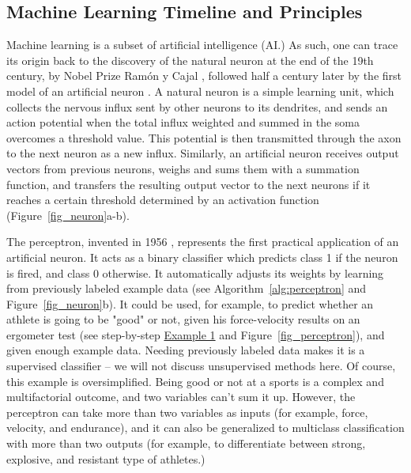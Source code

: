 \subsection{Machine Learning Timeline and Principles}

Machine learning is a subset of artificial intelligence (AI.) As such, one can trace its origin back to the discovery of the natural neuron at the end of the 19th century, by Nobel Prize Ramón y Cajal \cite{Lopez2006}, followed half a century later by the first model of an artificial neuron \cite{Mcculloch1943}. A natural neuron is a simple learning unit, which collects the nervous influx sent by other neurons to its dendrites, and sends an action potential when the total influx weighted and summed in the soma overcomes a threshold value. This potential is then transmitted through the axon to the next neuron as a new influx. Similarly, an artificial neuron receives output vectors from previous neurons, weighs and sums them with a summation function, and transfers the resulting output vector to the next neurons if it reaches a certain threshold determined by an activation function (Figure~\ref{fig_neuron}a-b). 

The perceptron, invented in 1956 \cite{Rosenblatt1958}, represents the first practical application of an artificial neuron. It acts as a binary classifier which predicts class 1 if the neuron is fired, and class 0 otherwise. It automatically adjusts its weights by learning from previously labeled example data (see Algorithm~\ref{alg:perceptron} and Figure~\ref{fig_neuron}b). It could be used, for example, to predict whether an athlete is going to be "good" or not, given his force-velocity results on an ergometer test (see step-by-step \hyperlink{example1}{Example 1} and Figure~\ref{fig_perceptron}), and given enough example data. Needing previously labeled data makes it is a supervised classifier – we will not discuss unsupervised methods here. Of course, this example is oversimplified. Being good or not at a sports is a complex and multifactorial outcome, and two variables can't sum it up. However, the perceptron can take more than two variables as inputs (for example, force, velocity, and endurance), and it can also be generalized to multiclass classification with more than two outputs (for example, to differentiate between strong, explosive, and resistant type of athletes.)

